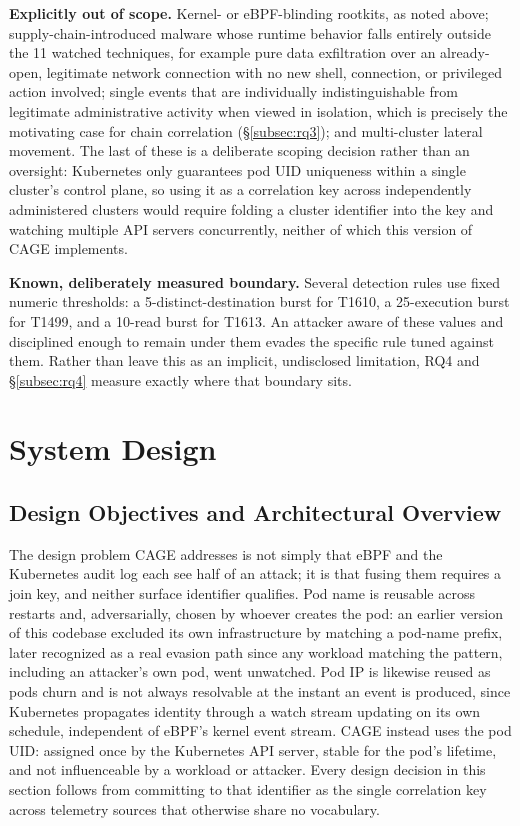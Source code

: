 \documentclass{ieeeaccess}
\begin{document}
\textbf{Explicitly out of scope.} Kernel- or eBPF-blinding rootkits, as
noted above; supply-chain-introduced malware whose runtime behavior
falls entirely outside the 11 watched techniques, for example pure
data exfiltration over an already-open, legitimate network connection
with no new shell, connection, or privileged action involved; single
events that are individually indistinguishable from legitimate
administrative activity when viewed in isolation, which is precisely
the motivating case for chain correlation (\S\ref{subsec:rq3}); and multi-cluster
lateral movement. The last of these is a deliberate scoping decision
rather than an oversight: Kubernetes only guarantees pod UID uniqueness
within a single cluster's control plane, so using it as a correlation
key across independently administered clusters would require folding a
cluster identifier into the key and watching multiple API servers
concurrently, neither of which this version of CAGE implements.

\textbf{Known, deliberately measured boundary.} Several detection rules use
fixed numeric thresholds: a 5-distinct-destination burst for T1610, a
25-execution burst for T1499, and a 10-read burst for T1613. An attacker
aware of these values and disciplined enough to remain under them evades
the specific rule tuned against them. Rather than leave this as an
implicit, undisclosed limitation, RQ4 and \S\ref{subsec:rq4} measure exactly where
that boundary sits.

\section{System Design}
\label{sec:system-design}

\subsection{Design Objectives and Architectural Overview}
\label{subsec:design-overview}

The design problem CAGE addresses is not simply that eBPF and the
Kubernetes audit log each see half of an attack; it is that fusing them
requires a join key, and neither surface identifier qualifies. Pod
name is reusable across restarts and, adversarially, chosen by
whoever creates the pod: an earlier version of this codebase excluded
its own infrastructure by matching a pod-name prefix, later recognized
as a real evasion path since any workload matching the pattern,
including an attacker's own pod, went unwatched. Pod IP is likewise
reused as pods churn and is not always resolvable at the instant an
event is produced, since Kubernetes propagates identity through a
watch stream updating on its own schedule, independent of eBPF's
kernel event stream. CAGE instead uses the pod UID: assigned once by
the Kubernetes API server, stable for the pod's lifetime, and not
influenceable by a workload or attacker. Every design decision in this
section follows from committing to that identifier as the single
correlation key across telemetry sources that otherwise share no
vocabulary.
\end{document}
